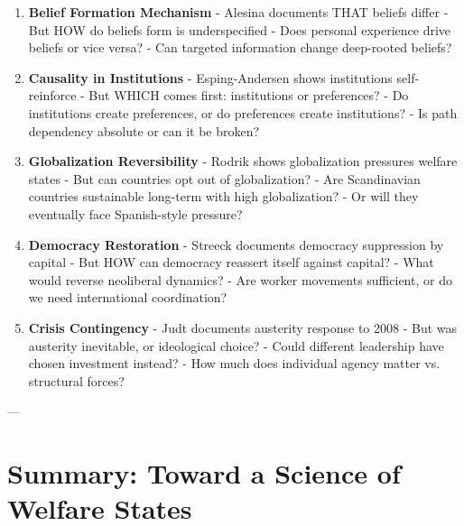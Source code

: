 \begin{tcolorbox}[colback=red!5!white, colframe=red!75!black,
    title=Remaining Questions and Limitations]

\begin{enumerate}

\item \textbf{Belief Formation Mechanism}
   - Alesina documents THAT beliefs differ
   - But HOW do beliefs form is underspecified
   - Does personal experience drive beliefs or vice versa?
   - Can targeted information change deep-rooted beliefs?

\item \textbf{Causality in Institutions}
   - Esping-Andersen shows institutions self-reinforce
   - But WHICH comes first: institutions or preferences?
   - Do institutions create preferences, or do preferences create institutions?
   - Is path dependency absolute or can it be broken?

\item \textbf{Globalization Reversibility}
   - Rodrik shows globalization pressures welfare states
   - But can countries opt out of globalization?
   - Are Scandinavian countries sustainable long-term with high globalization?
   - Or will they eventually face Spanish-style pressure?

\item \textbf{Democracy Restoration}
   - Streeck documents democracy suppression by capital
   - But HOW can democracy reassert itself against capital?
   - What would reverse neoliberal dynamics?
   - Are worker movements sufficient, or do we need international coordination?

\item \textbf{Crisis Contingency}
   - Judt documents austerity response to 2008
   - But was austerity inevitable, or ideological choice?
   - Could different leadership have chosen investment instead?
   - How much does individual agency matter vs. structural forces?

\end{enumerate}

\end{tcolorbox}

---

\clearpage


\section{Summary: Toward a Science of Welfare States}
\label{sec:summary}

